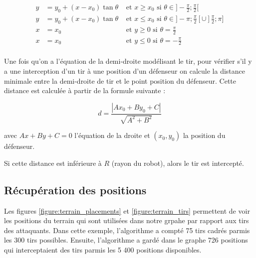 \documentclass[12pt]{article}
\begin{document}
\begin{align*}
y & =  y_0 + (x - x_0)\tan \theta & \text{ et $x \geqslant x_0$ si } \theta \in ]-\frac{\pi}{2}; \frac{\pi}{2} [ \\
y & = y_0 + (x - x_0)\tan \theta & \text{ et $x \leqslant x_0$ si } \theta \in ]-\pi; \frac{\pi}{2}[ \cup ]\frac{\pi}{2}; \pi ] \\
x & = x_0  & \text{ et $y \geqslant 0$ si } \theta = \frac{\pi}{2} \\
x & = x_0  & \text{ et $y \leqslant 0$ si } \theta = -\frac{\pi}{2} \\
\end{align*}

Une fois qu'on a l'équation de la demi-droite modélisant le tir, pour vérifier s'il y a une interception d'un tir à une position d'un défenseur on calcule la distance minimale entre la demi-droite de tir et le point position du défenseur. Cette distance est calculée à partir de la formule suivante :

\begin{equation*}
  d = \frac{|Ax_0 + By_0 + C|}{\sqrt{A^2+B^2}}
\end{equation*}

avec $Ax+By+C = 0$ l'équation de la droite et $(x_0, y_0)$ la position du défenseur.

 Si cette distance est inférieure à $R$ (rayon du robot), alors le tir est intercepté.

\subsection{Récupération des positions}

Les figures \ref{figure:terrain_placements} et \ref{figure:terrain_tirs} permettent de voir les positions du terrain qui sont utilisées dans notre grpahe par rapport aux tirs des attaquants. Dans cette exemple, l'algorithme a compté 75 tirs cadrés parmis les 300 tirs possibles. Ensuite, l'algorithme a gardé dans le graphe 726 positions qui interceptaient des tirs parmis les 5 400 positions disponibles.
\end{document}
